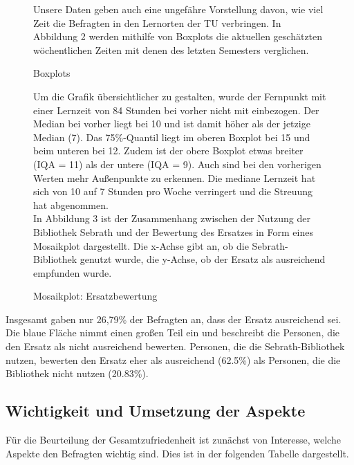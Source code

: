 \documentclass[11pt, a4paper]{article}
\begin{document}
\begin{figure}[htp]
	Unsere Daten geben auch eine ungefähre Vorstellung davon, wie viel Zeit die Befragten in den Lernorten der TU verbringen.
	In Abbildung 2 werden mithilfe von Boxplots die aktuellen geschätzten wöchentlichen Zeiten mit denen des letzten Semesters verglichen. \\
	\vspace{-1.5cm}
	\hspace{-0.8cm}
	{\centering} 
	\vspace{0cm}
	\caption{Boxplots}
	\vspace{0.7cm}
Um die Grafik übersichtlicher zu gestalten, wurde der Fernpunkt mit einer Lernzeit von 84 Stunden bei vorher nicht mit einbezogen.
Der Median bei vorher liegt bei 10 und ist damit höher als der jetzige Median (7).
Das 75\%-Quantil liegt im oberen Boxplot bei 15 und beim unteren bei 12.
Zudem ist der obere Boxplot etwas breiter (IQA = 11) als der untere (IQA = 9).
Auch sind bei den vorherigen Werten mehr Außenpunkte zu erkennen.
Die mediane Lernzeit hat sich von 10 auf 7 Stunden pro Woche verringert und die Streuung hat abgenommen.\\

In Abbildung 3 ist der Zusammenhang zwischen der Nutzung der Bibliothek Sebrath und der Bewertung des Ersatzes in Form eines Mosaikplot dargestellt. Die x-Achse gibt an, ob die Sebrath-Bibliothek genutzt wurde, die y-Achse, ob der Ersatz als ausreichend empfunden wurde. 
	
	\vspace{0.5cm}
	 \begin{center}
	{\centering } \end{center}
	\vspace{-1.5cm}
	\caption{Mosaikplot: Ersatzbewertung}
\end{figure}


\newpage
Insgesamt gaben nur 26,79\% der Befragten an, dass der Ersatz ausreichend sei. Die blaue Fläche nimmt einen großen Teil ein und beschreibt die Personen, die den Ersatz als nicht ausreichend bewerten. Personen, die die Sebrath-Bibliothek nutzen, bewerten den Ersatz eher als ausreichend (62.5\%) als Personen, die die Bibliothek nicht nutzen (20.83\%).

\subsection{Wichtigkeit und Umsetzung der Aspekte}
Für die Beurteilung der Gesamtzufriedenheit ist zunächst von Interesse, welche Aspekte den Befragten wichtig sind. Dies ist in der folgenden Tabelle dargestellt.
\end{document}
